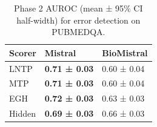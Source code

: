 \begin{table}
\caption{Phase 2 AUROC (mean ± 95\% CI half-width) for error detection on PUBMEDQA.}
\label{tab:phase2_auroc_pubmedqa}
\begin{tabular}{lll}
\toprule
Scorer & Mistral & BioMistral \\
\midrule
LNTP & \textbf{0.71 ± 0.03} & 0.60 ± 0.04 \\
MTP & \textbf{0.71 ± 0.03} & 0.60 ± 0.04 \\
EGH & \textbf{0.72 ± 0.03} & 0.63 ± 0.03 \\
Hidden & \textbf{0.69 ± 0.03} & 0.66 ± 0.03 \\
\bottomrule
\end{tabular}
\end{table}
